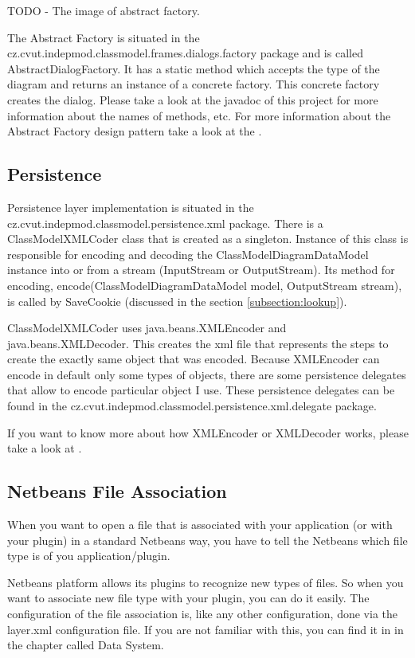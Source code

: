 TODO - The image of abstract factory.

The Abstract Factory is situated in the cz.cvut.indepmod.classmodel.frames.dialogs.factory package and is called AbstractDialogFactory. It has a static method which accepts the type of the diagram and returns an instance of a concrete factory. This concrete factory creates the dialog. Please take a look at the javadoc of this project for more information about the names of methods, etc. For more information about the Abstract Factory design pattern take a look at the \cite{DesignPatterns}.

\subsection{Persistence}
\label{subsection:persistence}

Persistence layer implementation is situated in the cz.cvut.indepmod.classmodel.persistence.xml package. There is a ClassModelXMLCoder class that is created as a singleton. Instance of this class is responsible for encoding and decoding the ClassModelDiagramDataModel instance into or from a stream (InputStream or OutputStream). Its method for encoding, encode(ClassModelDiagramDataModel model, OutputStream stream), is called by SaveCookie (discussed in the section \ref{subsection:lookup}).

ClassModelXMLCoder uses java.beans.XMLEncoder and java.beans.XMLDecoder. This creates the xml file that represents the steps to create the exactly same object that was encoded. Because XMLEncoder can encode in default only some types of objects, there are some persistence delegates that allow to encode particular object I use. These persistence delegates can be found in the cz.cvut.indepmod.classmodel.persistence.xml.delegate package.

If you want to know more about how XMLEncoder or XMLDecoder works, please take a look at \cite{usingXMLEncoder}.

\subsection{Netbeans File Association}
\label{subsection:fileAssociation}

When you want to open a file that is associated with your application (or with your plugin) in a standard Netbeans way, you have to tell the Netbeans which file type is of you application/plugin. 

Netbeans platform allows its plugins to recognize new types of files. So when you want to associate new file type with your plugin, you can do it easily. The configuration of the file association is, like any other configuration, done via the layer.xml configuration file. If you are not familiar with this, you can find it in \cite{netbeans6.9DevGuide} in the chapter called Data System.

